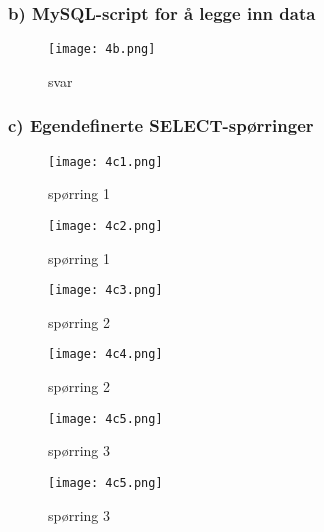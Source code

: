\documentclass{article}
\begin{document}
\subsubsection*{b) MySQL-script for å legge inn data}
\begin{figure}[H]
    \centering
    \texttt{[image: 4b.png]}
    \caption{svar}
    \label{fig:example}
\end{figure}

\subsubsection*{c) Egendefinerte SELECT-spørringer}
\begin{figure}[H]
    \centering
    \texttt{[image: 4c1.png]}
    \caption{spørring 1}
    \label{fig:example}
\end{figure}
\begin{figure}[H]
    \centering
    \texttt{[image: 4c2.png]}
    \caption{spørring 1}
    \label{fig:example}
\end{figure}
\begin{figure}[H]
    \centering
    \texttt{[image: 4c3.png]}
    \caption{spørring 2}
    \label{fig:example}
\end{figure}
\begin{figure}[H]
    \centering
    \texttt{[image: 4c4.png]}
    \caption{spørring 2}
    \label{fig:example}
\end{figure}
\begin{figure}[H]
    \centering
    \texttt{[image: 4c5.png]}
    \caption{spørring 3}
    \label{fig:example}
\end{figure}
\begin{figure}[H]
    \centering
    \texttt{[image: 4c5.png]}
    \caption{spørring 3 }
    \label{fig:example}
\end{figure}
\end{document}
